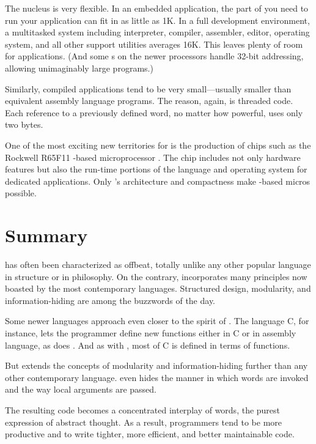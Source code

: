 The \Forth{} nucleus is very flexible. In an embedded application, the
part of \Forth{} you need to run your application can fit in as little
as 1K. In a full development environment, a multitasked \Forth{} system
including interpreter, compiler, assembler,%
editor, operating system, and all other support utilities averages
16K. This leaves plenty of room for applications. (And some \Forth{}s on
the newer processors handle 32-bit addressing, allowing unimaginably
large programs.)

Similarly, \Forth{} compiled applications tend to be very small---usually
smaller than equivalent assembly language programs. The reason, again,
is threaded code. Each reference to a previously defined word, no
matter how powerful, uses only two bytes.

One of the most exciting new territories for \Forth{} is the production
of \Forth{} chips such as the
Rockwell R65F11 \Forth{}-based microprocessor%
\cite{dumse}. The chip includes not only hardware features but also
the run-time portions of the \Forth{} language and operating system for
dedicated applications. Only \Forth{}'s architecture and compactness make
\Forth{}-based micros possible.%
%
%


\section{Summary}
\Forth{} has often been characterized as offbeat, totally unlike any
other popular language in structure or in philosophy. On the contrary,
\Forth{} incorporates many principles now boasted by the most
contemporary languages. Structured design, modularity, and
information-hiding are among the buzzwords of the day.

Some newer languages approach even closer to the spirit of \Forth{}.  The
language C, for instance, lets the programmer define new functions
either in C or in assembly language, as does \Forth{}. And as with \Forth{},
most of C is defined in terms of functions.

But \Forth{} extends the concepts of modularity and information-hiding
further than any other contemporary language. \Forth{} even hides the
manner in which words are invoked and the way local arguments are
passed.

The resulting code becomes a concentrated interplay of words, the
purest expression of abstract thought. As a result, \Forth{} programmers
tend to be more productive and to write tighter, more efficient, and
better maintainable code.

